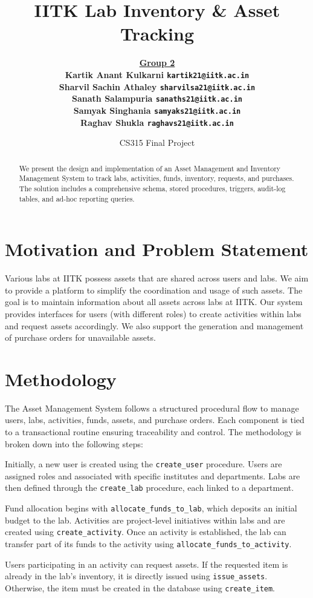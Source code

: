 \documentclass[11pt]{article}
\title{\bf IITK Lab Inventory \& Asset Tracking}
\author{
  \textbf{\underline{Group 2}} \\
  \bf Kartik Anant Kulkarni \qquad 210493 \qquad \texttt{kartik21@iitk.ac.in} \\
  \bf Sharvil Sachin Athaley \qquad 210961 \qquad \texttt{sharvilsa21@iitk.ac.in} \\
  \bf Sanath Salampuria \qquad 210919 \qquad \texttt{sanaths21@iitk.ac.in} \\
  \bf Samyak Singhania \qquad 210917 \qquad \texttt{samyaks21@iitk.ac.in} \\
  \bf Raghav Shukla \qquad 210800 \qquad \texttt{raghavs21@iitk.ac.in}
}
\date{CS315 Final Project}
\begin{document}
\maketitle

\begin{abstract}
We present the design and implementation of an Asset Management and Inventory Management System to track labs, activities, funds, inventory, requests, and purchases. The solution includes a comprehensive schema, stored procedures, triggers, audit-log tables, and ad-hoc reporting queries.
\end{abstract}

\section{Motivation and Problem Statement}
Various labs at IITK possess assets that are shared across users and labs. We aim to provide a platform to simplify the coordination and usage of such assets. The goal is to maintain information about all assets across labs at IITK. Our system provides interfaces for users (with different roles) to create activities within labs and request assets accordingly. We also support the generation and management of purchase orders for unavailable assets.

\section{Methodology}

The Asset Management System follows a structured procedural flow to manage users, labs, activities, funds, assets, and purchase orders. Each component is tied to a transactional routine ensuring traceability and control. The methodology is broken down into the following steps:

Initially, a new user is created using the \texttt{create\_user} procedure. Users are assigned roles and associated with specific institutes and departments. Labs are then defined through the \texttt{create\_lab} procedure, each linked to a department.

Fund allocation begins with \texttt{allocate\_funds\_to\_lab}, which deposits an initial budget to the lab. Activities are project-level initiatives within labs and are created using \texttt{create\_activity}. Once an activity is established, the lab can transfer part of its funds to the activity using \texttt{allocate\_funds\_to\_activity}.

Users participating in an activity can request assets. If the requested item is already in the lab's inventory, it is directly issued using \texttt{issue\_assets}. Otherwise, the item must be created in the database using \texttt{create\_item}.
\end{document}
